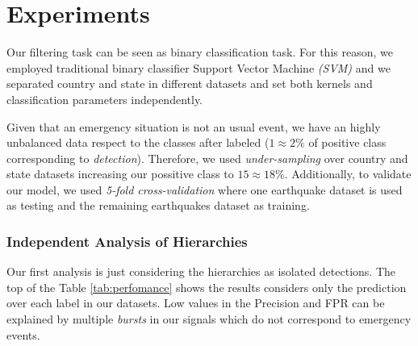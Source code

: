 \documentclass{llncs}
\begin{document}
\section{Experiments}

Our filtering task can be seen as binary classification task. For this reason, we employed traditional binary classifier Support Vector Machine \textit{(SVM)} and we separated country and state in different datasets and set both kernels and classification parameters independently.


 



Given that an emergency situation is not an usual event, we have an highly unbalanced data respect to the classes after labeled ($1\approx2\%$ of positive class corresponding to \textit{detection}). Therefore, we used \textit{under-sampling} over country and state datasets increasing our possitive class to $15\approx18\%$. Additionally, to validate our model, we used \textit{5-fold cross-validation} where one earthquake dataset is used as testing and the remaining earthquakes dataset as training.



\subsubsection{Independent Analysis of Hierarchies} 
Our first analysis is just considering the hierarchies as isolated detections. The top of the Table \ref{tab:perfomance} shows the results considers only the prediction over each label in our datasets. Low values in the Precision and FPR can be explained by multiple \textit{bursts} in our signals which do not correspond to emergency events.
\end{document}
